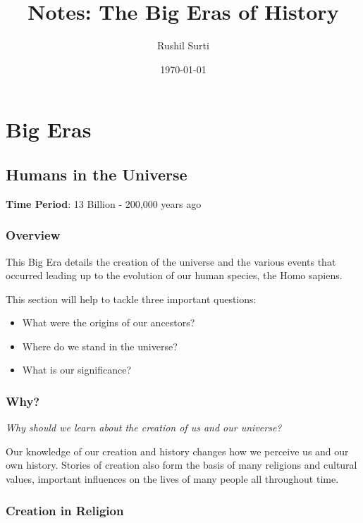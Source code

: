 \documentclass[11pt]{article}
\author{Rushil Surti}
\date{\today}
\title{Notes: The Big Eras of History}
\begin{document}
\maketitle
\tableofcontents

\newpage

\section{Big Eras}
\label{sec:org7f245bd}
\subsection{Humans in the Universe}
\label{sec:org50b08ef}

\textbf{Time Period}: 13 Billion - 200,000 years ago

\subsubsection{Overview}
\label{sec:org971152e}

This Big Era details the creation of the universe and the various events that occurred leading up to the evolution of our human species, the Homo sapiens.

This section will help to tackle three important questions:

\begin{itemize}
\item What were the origins of our ancestors?
\item Where do we stand in the universe?
\item What is our significance?
\end{itemize}

\subsubsection{Why?}
\label{sec:org5b97996}

\emph{Why should we learn about the creation of us and our universe?}

Our knowledge of our creation and history changes how we perceive us and our own history. Stories of creation also form the basis of many religions and cultural values, important influences on the lives of many people all throughout time.

\subsubsection{Creation in Religion}
\label{sec:org314de88}
\end{document}

